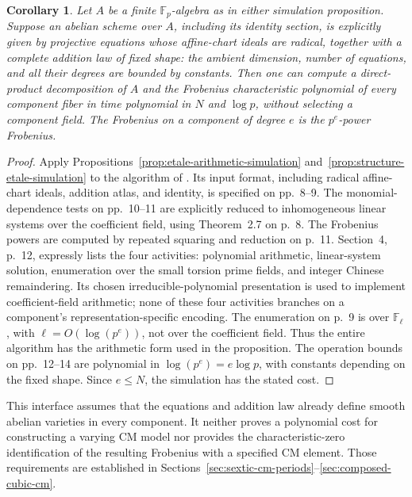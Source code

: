 \documentclass[11pt]{article}
\newtheorem{corollary}[theorem]{Corollary}
\theoremstyle{definition}
\theoremstyle{remark}
\begin{document}
\begin{corollary}\label{cor:etale-pila}
Let \(A\) be a finite \(\mathbb F_p\)-algebra as in either simulation
proposition. Suppose an abelian scheme over \(A\), including its identity
section, is explicitly given by projective equations whose
affine-chart ideals are radical, together with a
complete addition law of fixed shape:
the ambient dimension, number of equations, and all their
degrees are bounded by constants. Then one can compute a
direct-product decomposition of \(A\) and the Frobenius characteristic polynomial
of every component fiber in time polynomial in \(N\) and
\(\log p\), without selecting a component field.
The Frobenius on a component of degree \(e\) is the
\(p^e\)-power Frobenius.
\end{corollary}
\begin{proof}
Apply Propositions~\ref{prop:etale-arithmetic-simulation}
and~\ref{prop:structure-etale-simulation} to the
algorithm of \citet[Theorem~A; Sections~3--4,
author/PDF pp.~8--14]{Pila1990}. Its input format, including
radical affine-chart ideals, addition atlas, and identity, is
specified on pp.~8--9. The monomial-dependence tests on
pp.~10--11 are explicitly reduced to inhomogeneous linear
systems over the coefficient field, using Theorem~2.7 on p.~8.
The Frobenius powers are computed by repeated squaring and
reduction on p.~11. Section~4, p.~12, expressly lists the four
activities: polynomial arithmetic, linear-system solution,
enumeration over the small torsion prime fields, and integer
Chinese remaindering. Its chosen irreducible-polynomial
presentation is used to implement coefficient-field arithmetic;
none of these four activities branches on a component's
representation-specific encoding. The enumeration on p.~9
is over \(\mathbb F_\ell\), with \(\ell=O(\log(p^e))\),
not over the coefficient field. Thus the entire algorithm has
the arithmetic form used in the proposition. The operation
bounds on pp.~12--14 are polynomial in
\(\log(p^e)=e\log p\), with constants depending on the fixed
shape. Since \(e\leq N\), the simulation has the stated cost.
\end{proof}

This interface assumes that the equations and addition law
already define smooth abelian varieties in every component.
It neither proves a polynomial cost for constructing a varying
CM model nor provides the characteristic-zero identification of
the resulting Frobenius with a specified CM element. Those requirements are established in
Sections~\ref{sec:sextic-cm-periods}--\ref{sec:composed-cubic-cm}.
\end{document}
